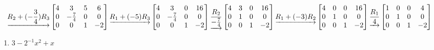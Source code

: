 \documentclass[
  11,
]{article}
\providecommand{\tightlist}{%
  \setlength{\itemsep}{0pt}\setlength{\parskip}{0pt}}
\begin{document}
\[\underrightarrow{ R_2 + (- \frac{3}{4})R_3 }
\left[\begin{matrix}4 & 3 & 5 & 6\\0 & - \frac{7}{4} & 0 & 0\\0 & 0 & 1 & -2\end{matrix}\right]
\underrightarrow{ R_1 + (-5)R_3 }
\\
\left[\begin{matrix}4 & 3 & 0 & 16\\0 & - \frac{7}{4} & 0 & 0\\0 & 0 & 1 & -2\end{matrix}\right]
\underrightarrow{ \frac{R_2}{- \frac{7}{4}} }
\left[\begin{matrix}4 & 3 & 0 & 16\\0 & 1 & 0 & 0\\0 & 0 & 1 & -2\end{matrix}\right]
\underrightarrow{ R_1 + (-3)R_2 }
\\
\left[\begin{matrix}4 & 0 & 0 & 16\\0 & 1 & 0 & 0\\0 & 0 & 1 & -2\end{matrix}\right]
\underrightarrow{ \frac{R_1}{4} }
\left[\begin{matrix}1 & 0 & 0 & 4\\0 & 1 & 0 & 0\\0 & 0 & 1 & -2\end{matrix}\right]
  \]

\begin{enumerate}
\def\labelenumi{\alph{enumi})}
\setcounter{enumi}{2}
\tightlist
\item
  \(3-2^{-1}x^2 + x\)
\end{enumerate}
\end{document}
